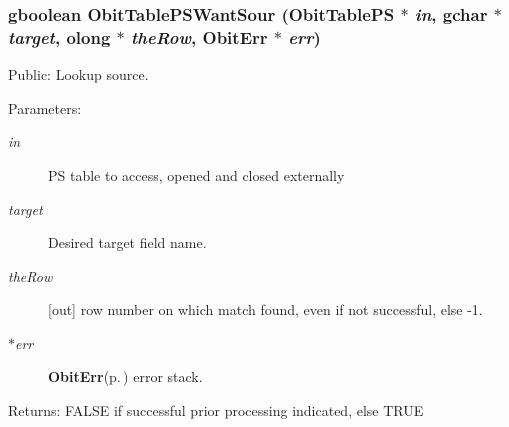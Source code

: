 \subsubsection{\setlength{\rightskip}{0pt plus 5cm}gboolean Obit\-Table\-PSWant\-Sour ({\bf Obit\-Table\-PS} $\ast$ {\em in}, gchar $\ast$ {\em target}, {\bf olong} $\ast$ {\em the\-Row}, {\bf Obit\-Err} $\ast$ {\em err})}\label{ObitTablePSUtil_8h_a0}


Public: Lookup source. 

\begin{Desc}
\item[Parameters:]
\begin{description}
\item[{\em in}]PS table to access, opened and closed externally \item[{\em target}]Desired target field name. \item[{\em the\-Row}][out] row number on which match found, even if not successful, else -1. \item[{\em $\ast$err}]{\bf Obit\-Err}{\rm (p.\,\pageref{structObitErr})} error stack. \end{description}
\end{Desc}
\begin{Desc}
\item[Returns:]FALSE if successful prior processing indicated, else TRUE \end{Desc}
